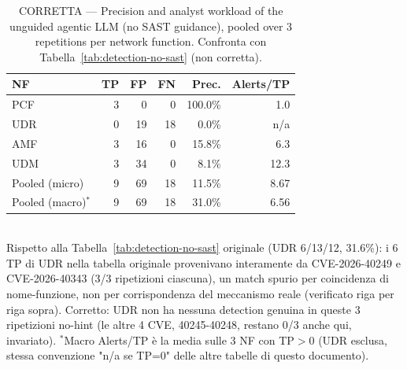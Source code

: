 \begin{table}[t]
\centering
\caption{CORRETTA — Precision and analyst workload of the unguided agentic LLM (no SAST guidance), pooled over 3 repetitions per network function. Confronta con Tabella~\ref{tab:detection-no-sast} (non corretta).}
\label{tab:detection-no-sast-corretta}
\begin{tabular}{lrrrrr}
\toprule
NF & TP & FP & FN & Prec. & Alerts/TP \\
\midrule
PCF & 3  & 0  & 0  & 100.0\% & 1.0 \\
UDR & 0  & 19 & 18 & 0.0\%   & n/a \\
AMF & 3  & 16 & 0  & 15.8\%  & 6.3 \\
UDM & 3  & 34 & 0  & 8.1\%   & 12.3 \\
\midrule
Pooled (micro) & 9 & 69 & 18 & 11.5\% & 8.67 \\
Pooled (macro)$^{*}$ & 9 & 69 & 18 & 31.0\% & 6.56 \\
\bottomrule
\end{tabular}
\\[2pt]
\footnotesize{Rispetto alla Tabella~\ref{tab:detection-no-sast} originale (UDR 6/13/12, 31.6\%): i 6 TP di UDR nella tabella originale provenivano interamente da CVE-2026-40249 e CVE-2026-40343 (3/3 ripetizioni ciascuna), un match spurio per coincidenza di nome-funzione, non per corrispondenza del meccanismo reale (verificato riga per riga sopra). Corretto: UDR non ha nessuna detection genuina in queste 3 ripetizioni no-hint (le altre 4 CVE, 40245-40248, restano 0/3 anche qui, invariato). $^{*}$Macro Alerts/TP è la media sulle 3 NF con TP$>0$ (UDR esclusa, stessa convenzione "n/a se TP=0" delle altre tabelle di questo documento).}
\end{table}
